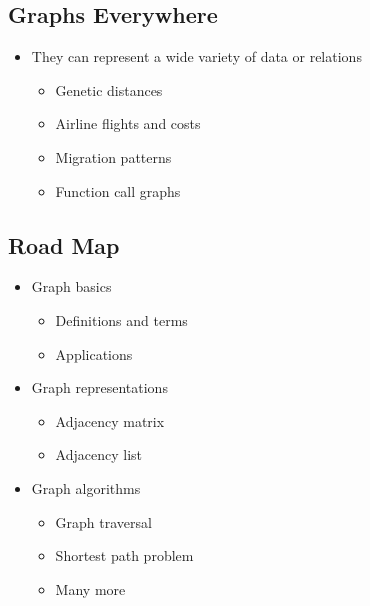 \documentclass[
  10pt,
  english,
  letterpaper,
,tablecaptionabove
]{scrartcl}
\providecommand{\tightlist}{%
  \setlength{\itemsep}{0pt}\setlength{\parskip}{0pt}}
\begin{document}
\hypertarget{graphs-everywhere}{%
\subsection{Graphs Everywhere}\label{graphs-everywhere}}

\begin{itemize}
\tightlist
\item
  They can represent a wide variety of data or relations

  \begin{itemize}
  \tightlist
  \item
    Genetic distances
  \item
    Airline flights and costs
  \item
    Migration patterns
  \item
    Function call graphs
  \end{itemize}
\end{itemize}

\hypertarget{road-map}{%
\subsection{Road Map}\label{road-map}}

\begin{itemize}
\tightlist
\item
  Graph basics

  \begin{itemize}
  \tightlist
  \item
    Definitions and terms
  \item
    Applications
  \end{itemize}
\item
  Graph representations

  \begin{itemize}
  \tightlist
  \item
    Adjacency matrix
  \item
    Adjacency list
  \end{itemize}
\item
  Graph algorithms

  \begin{itemize}
  \tightlist
  \item
    Graph traversal
  \item
    Shortest path problem
  \item
    Many more
  \end{itemize}
\end{itemize}
\end{document}
